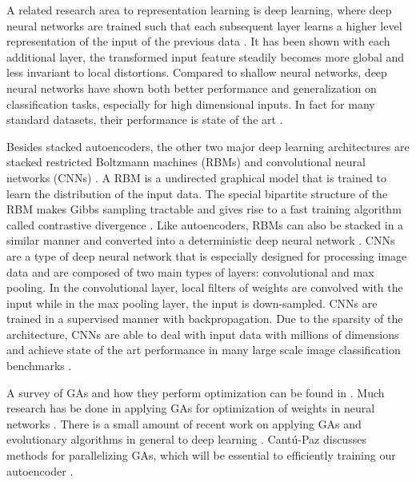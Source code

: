 A related research area to representation learning is deep learning, where deep neural networks are trained such that each subsequent layer learns a higher level representation of the input of the previous data \cite{bengio2009learning}. It has been shown with each additional layer, the transformed input feature steadily becomes more global and less invariant to local distortions. Compared to shallow neural networks, deep neural networks have shown both better performance and generalization on classification tasks, especially for high dimensional inputs. In fact for many standard datasets, their performance is state of the art \cite{schmidhuber2014deep}. 

Besides stacked autoencoders, the other two major deep learning architectures are stacked restricted Boltzmann machines (RBMs) \cite{hinton2006fast} and convolutional neural networks (CNNs) \cite{lecun1995convolutional}. A RBM is a undirected graphical model that is trained to learn the distribution of the input data. The special bipartite structure of the RBM makes Gibbs sampling tractable and gives rise to a fast training algorithm called contrastive divergence \cite{hinton2006fast,hinton2006learning}. Like autoencoders, RBMs can also be stacked in a similar manner and converted into a deterministic deep neural network \cite{hinton2006reducing}. CNNs are a type of deep neural network that is especially designed for processing image data and are composed of two main types of layers: convolutional and max pooling. In the convolutional layer, local filters of weights are convolved with the input while in the max pooling layer, the input is down-sampled. CNNs are trained in a supervised manner with backpropagation. Due to the sparsity of the architecture, CNNs are able to deal with input data with millions of dimensions and achieve state of the art performance in many large scale image classification benchmarks \cite{ciresan2011committee,krizhevsky2012imagenet,goodfellow2013multi}.

A survey of GAs and how they perform optimization can be found in \cite{srinivas1994genetic}. Much research has be done in applying GAs for optimization of weights in neural networks \cite{gomez2006efficient,floreano2008neuroevolution}. There is a small amount of recent work on applying GAs and evolutionary algorithms in general to deep learning \cite{koutnik2014evolving,david2014genetic}. Cant{\'u}-Paz discusses methods for parallelizing GAs, which will be essential to efficiently training our autoencoder \cite{cantu1998survey}.

